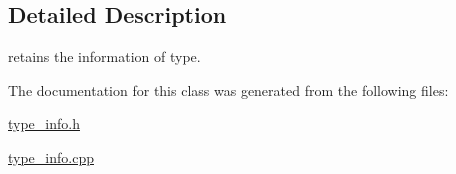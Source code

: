 \subsection{Detailed Description}
retains the information of type. 

The documentation for this class was generated from the following files\-:\begin{DoxyCompactItemize}
\item 
\hyperlink{type__info_8h}{type\-\_\-info.\-h}\item 
\hyperlink{type__info_8cpp}{type\-\_\-info.\-cpp}\end{DoxyCompactItemize}
